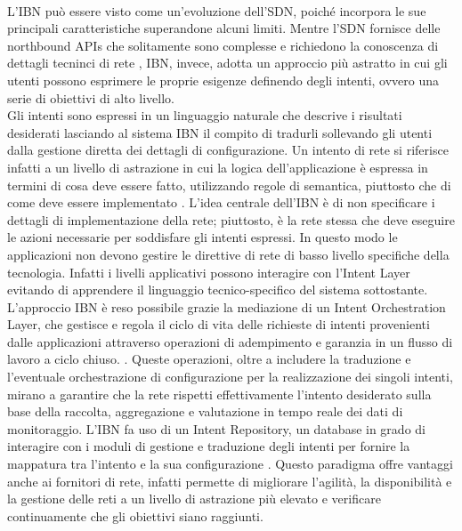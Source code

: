\\L'IBN può essere visto come un'evoluzione dell'SDN, poiché incorpora le sue principali caratteristiche superandone alcuni limiti.
Mentre l'SDN fornisce delle northbound APIs che solitamente sono complesse e richiedono la conoscenza di dettagli tecninci di rete \cite{motivibn},
IBN, invece, adotta un approccio più astratto in cui gli utenti possono esprimere le proprie esigenze definendo degli intenti, ovvero una serie di obiettivi di alto livello.
\\Gli intenti sono espressi in un linguaggio naturale che descrive i risultati desiderati lasciando al sistema IBN il compito di tradurli sollevando gli utenti dalla gestione diretta dei dettagli di configurazione.
Un intento di rete si riferisce infatti a un livello di astrazione in cui la logica dell'applicazione è espressa in termini di cosa deve essere fatto, utilizzando regole di semantica, piuttosto che di come deve essere implementato \cite{ibn2}.
L'idea centrale dell'IBN è di non specificare i dettagli di implementazione della rete; piuttosto, è la rete stessa che deve eseguire le azioni necessarie per soddisfare gli intenti espressi.
In questo modo le applicazioni non devono gestire le direttive di rete di basso livello specifiche della tecnologia. Infatti i livelli applicativi possono interagire con l'Intent Layer evitando di apprendere il linguaggio tecnico-specifico del sistema sottostante.
\\L'approccio IBN è reso possibile grazie la mediazione di un Intent Orchestration Layer, che gestisce e regola il ciclo di vita delle richieste di intenti provenienti dalle applicazioni attraverso operazioni 
di adempimento e garanzia in un flusso di lavoro a ciclo chiuso. \cite{ibn}.
Queste operazioni, oltre a includere la traduzione e l'eventuale orchestrazione di configurazione per la realizzazione dei singoli intenti, mirano a garantire che la rete rispetti effettivamente l'intento desiderato 
sulla base della raccolta, aggregazione e valutazione in tempo reale dei dati di monitoraggio.
L'IBN fa uso di un Intent Repository, un database in grado di interagire con i moduli di gestione e traduzione 
degli intenti per fornire la mappatura tra l'intento e la sua configurazione \cite{ibnrepo}.
Questo paradigma offre vantaggi anche ai fornitori di rete, infatti permette di migliorare l'agilità, la disponibilità
e la gestione delle reti a un livello di astrazione più elevato e verificare continuamente che gli obiettivi siano raggiunti. 

